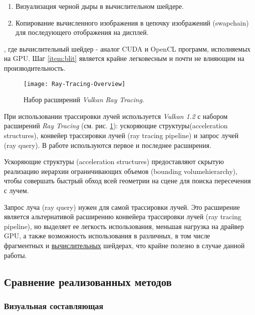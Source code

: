 \begin{enumerate}
    \item Визуализация черной дыры в вычислительном шейдере.
    \item Копирование вычисленного изображения в цепочку изображений \linebreak(swapchain) для последующего отображения на дисплей.
    \label{item:blit}
\end{enumerate}
, где вычислительный шейдер - аналог CUDA и OpenCL программ, исполняемых на GPU. Шаг \ref{item:blit} является крайне легковесным и почти не влияющим на производительность.

\begin{figure}[h]
    \centering
    \texttt{[image: Ray-Tracing-Overview]}
    \caption{Набор расширений \textit{Vulkan Ray Tracing}.}
    \label{fig:raytracing_overview}
\end{figure}

При использовании трассировки лучей используется \textit{Vulkan 1.2} с набором расширений \textit{Ray Tracing} (см. рис. \ref{fig:raytracing_overview}): ускоряющие структуры\linebreak (acceleration structures), конвейер трассировки лучей (ray tracing pipeline) и запрос лучей (ray query). В работе используются первое и последнее расширения.

Ускоряющие структуры (acceleration structures) предоставляют скрытую реализацию иерархии ограничивающих объемов (bounding volume\linebreak hierarchy), чтобы совершать быстрый обход всей геометрии на сцене для поиска пересечения с лучем.

Запрос луча (ray query) нужен для самой трассировки лучей. Это расширение является альтернативой расширению конвейера трассировки лучей (ray tracing pipeline), но выделяет ее легкость использования, меньшая нагрузка на драйвер GPU, а также возможность использования в различных, в том числе фрагментных и \underline{вычислительных} шейдерах, что крайне полезно в случае данной работы.

\subsection{Сравнение реализованных методов}

\subsubsection{Визуальная составляющая}

